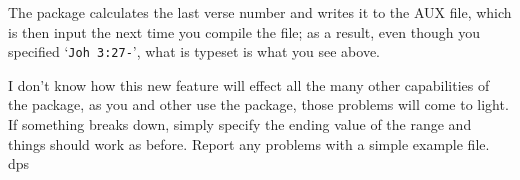 \documentclass{article}
\begin{document}
The package calculates the last verse number and writes it to the AUX file, which is then input the next time
you compile the file; as a result, even though you specified `\texttt{Joh 3:27-}', what is typeset is what you see above.

I don't know how this new feature will effect all the many other capabilities of the package, as you and other use the package,
those problems will come to light. If something breaks down, simply specify the ending value of the range and things should work
as before. Report any problems with a simple example file. dps
\end{document}
